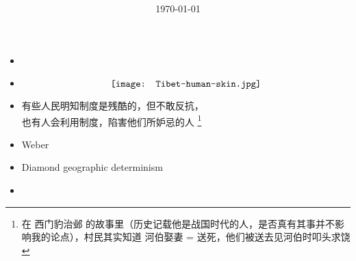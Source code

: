\begin{preview}

\title{\vspace{-1.5cm} \bfseries{}}

\date{\vspace{-2.4cm} \tiny \today} %

\maketitle

\setcounter{section}{-1}
\setcounter{mypage}{0}


\begin{minipage}{\textwidth}
\setlength{\parskip}{0.4\baselineskip}

\begin{itemize}
	\item {}
		{}
	\item {}
		{}
	\begin{equation}
		\vcenter{\hbox{\texttt{[image: Tibet-human-skin.jpg]}}}
		\nonumber
	\end{equation}
		{}
	\item 有些人民明知制度是残酷的，但不敢反抗，\\
		也有人会利用制度，陷害他们所妒忌的人 
		\footnote{在 西门豹治邺 的故事里（历史记载他是战国时代的人，是否真有其事并不影响我的论点），村民其实知道 河伯娶妻 = 送死，他们被送去见河伯时叩头求饶}
	\item Weber 
	\item Diamond geographic determinism
	\item 
\end{itemize}

\end{minipage}
\end{preview}

